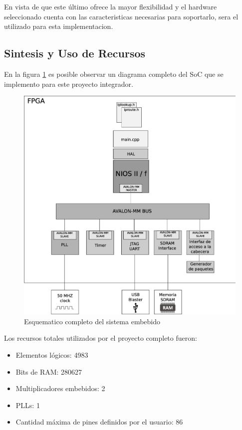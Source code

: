 En vista de que este último ofrece la mayor flexibilidad y el hardware seleccionado cuenta con las caracteristicas necesarias para soportarlo, sera el utilizado para esta implementacion. 




\subsection{Sintesis y Uso de Recursos}

En la figura \ref{fig:comple} es posible observar un diagrama completo del SoC que se implemento para este proyecto integrador.

\begin{figure}[H]
  \centering
	\includegraphics[scale=0.40]{4-implementacion/graf/sistema.eps}
  \caption{Esquematico completo del sistema embebido}
  \label{fig:comple}
\end{figure}

Los recursos totales utilizados por el proyecto completo fueron:
\begin{itemize}
\item Elementos lógicos: 4983
	\item Bits de RAM: 280627
	\item Multiplicadores embebidos: 2
	\item PLLs: 1
	\item Cantidad máxima de pines definidos por el usuario: 86
\end{itemize}

